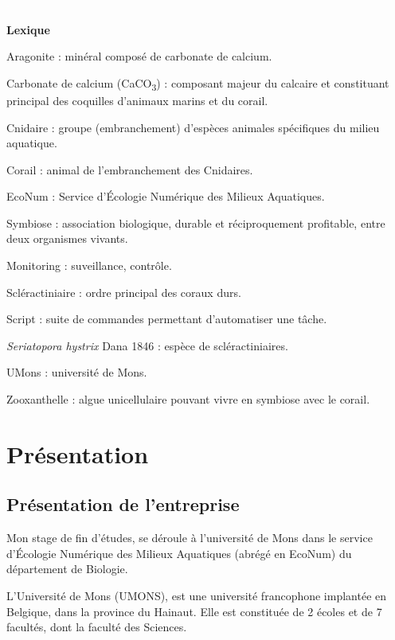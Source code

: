 \documentclass[]{report}
\begin{document}
\null
\newpage


\tableofcontents

\null
\newpage

\textcolor{white}{.}

\Huge 
{\bf Lexique} \vspace{1 cm}

\normalsize
Aragonite : minéral composé de carbonate de calcium.

Carbonate de calcium (CaCO\textsubscript{3}) : composant majeur du
calcaire et constituant principal des coquilles d'animaux marins et du
corail.

Cnidaire : groupe (embranchement) d'espèces animales spécifiques du
milieu aquatique.

Corail : animal de l'embranchement des Cnidaires.

EcoNum : Service d'Écologie Numérique des Milieux Aquatiques.

Symbiose : association biologique, durable et réciproquement profitable,
entre deux organismes vivants.

Monitoring : suveillance, contrôle.

Scléractiniaire : ordre principal des coraux durs.

Script : suite de commandes permettant d'automatiser une tâche.

\emph{Seriatopora hystrix} Dana 1846 : espèce de scléractiniaires.

UMons : université de Mons.

Zooxanthelle : algue unicellulaire pouvant vivre en symbiose avec le
corail.

\null
\newpage

\chapter{Présentation}\label{presentation}

\section{Présentation de
l'entreprise}\label{presentation-de-lentreprise}

Mon stage de fin d'études, se déroule à l'université de Mons dans le
service d'Écologie Numérique des Milieux Aquatiques (abrégé en EcoNum)
du département de Biologie.

L'Université de Mons (UMONS), est une université francophone implantée
en Belgique, dans la province du Hainaut. Elle est constituée de 2
écoles et de 7 facultés, dont la faculté des Sciences.
\end{document}
